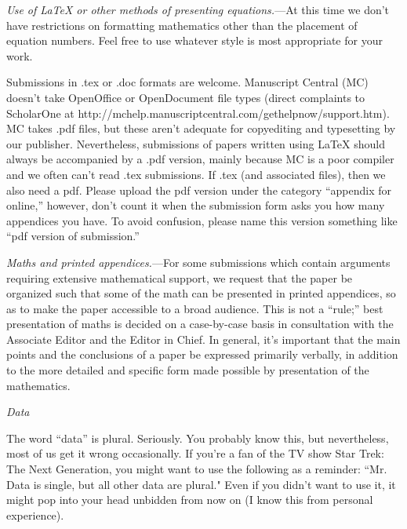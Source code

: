 \documentclass[12pt,letterpaper]{article}
\renewcommand{\subsection}[1]{%
\bigskip
\begin{center}
\begin{large}
\normalfont\itshape #1
\end{large}
\end{center}}
\renewcommand{\subsubsection}[1]{%
\vspace{2ex}
\noindent
\textit{#1.}---}
\begin{document}
\subsubsection{Use of LaTeX or other methods of presenting equations}At this time we don't have restrictions on formatting mathematics other than the placement of equation numbers. Feel free to use whatever style is most appropriate for your work.

Submissions in .tex or .doc formats are welcome. Manuscript Central
(MC) doesn't take OpenOffice or OpenDocument file types (direct
complaints to ScholarOne at
http://mchelp.manuscriptcentral.com/gethelpnow/support.htm). MC takes
.pdf files, but these aren't adequate for copyediting and typesetting
by our publisher. Nevertheless, submissions of papers written using
LaTeX should always be accompanied by a .pdf version, mainly because
MC is a poor compiler and we often can't read .tex submissions.
If .tex
(and associated files), then we also need a pdf. Please upload the pdf
version under the category ``appendix for online,'' however, don't
count it when the submission form asks you how many appendices you
have. To avoid confusion, please name this version something like ``pdf
version of submission.''

\subsubsection{Maths and printed appendices}For some submissions which
contain arguments requiring extensive mathematical support, we request
that the paper be organized such that some of the math can be
presented in printed appendices, so as to make the paper accessible to
a broad audience. This is not a ``rule;'' best presentation of maths
is decided on a case-by-case basis in consultation with the Associate
Editor and the Editor in Chief. In general, it's important that the
main points and the conclusions of a paper be expressed primarily
verbally, in addition to the more detailed and specific form made
possible by presentation of the mathematics.

\subsection{Data}

The word ``data'' is plural. Seriously. You probably know this, but
nevertheless, most
of us get it wrong occasionally. If you're a fan of the TV show Star
Trek: The Next Generation, you might want to use the following as a
reminder: ``Mr. Data is single, but all other data are plural." Even
if you didn't want to use it, it might pop into your head unbidden from now on (I know this from personal experience).
\end{document}
